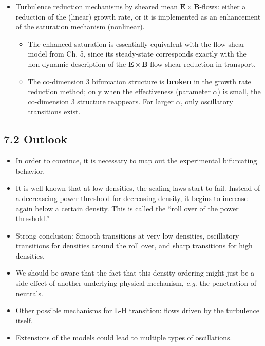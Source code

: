 \documentclass[a4paper]{article}
\begin{document}
\begin{itemize}
  \begin{itemize}
  \item
    Turbulence reduction mechanisms by sheared mean
    $\mathbf{E}\times\mathbf{B}$-flows: either a reduction of the
    (linear) growth rate, or it is implemented as an enhancement of the
    saturation mechanism (nonlinear).

    \begin{itemize}
    \item
      The enhanced saturation is essentially equivalent with the flow
      shear model from Ch. 5, since its steady-state corresponds exactly
      with the non-dynamic description of the
      $\mathbf{E}\times\mathbf{B}$-flow shear reduction in transport.
    \item
      The co-dimension 3 bifurcation structure is \textbf{broken} in the
      growth rate reduction method; only when the effectiveness
      (parameter $\alpha$) is small, the co-dimension 3 structure
      reappears. For larger $\alpha$, only oscillatory transitions
      exist.
    \end{itemize}
  \end{itemize}
\end{itemize}

\subsection{7.2 Outlook}\label{outlook}

\begin{itemize}
\item
  In order to convince, it is necessary to map out the experimental
  bifurcating behavior.
\item
  It is well known that at low densities, the scaling laws start to
  fail. Instead of a decreaseing power threshold for decreasing density,
  it begins to increase again below a certain density. This is called
  the ``roll over of the power threshold.''
\item
  Strong conclusion: Smooth transitions at very low densities,
  oscillatory transitions for densities around the roll over, and sharp
  transitions for high densities.
\item
  We should be aware that the fact that this density ordering might just
  be a side effect of another underlying physical mechanism, \emph{e.g.}
  the penetration of neutrals.
\item
  Other possible mechanisms for L-H transition: flows driven by the
  turbulence itself.
\item
  Extensions of the models could lead to multiple types of oscillations.
\end{itemize}
\end{document}
